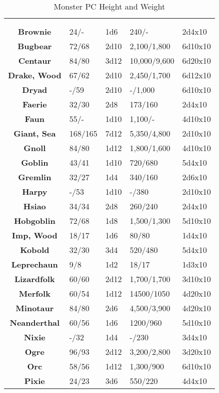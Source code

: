 \begin{multicols*}{2}
\begin {table}[H]
  \caption{Monster PC Height and Weight}\label{tab:Monster PC Height and Weight}
  \begin{tabularx}{\columnwidth}{>{\bfseries}cYYYY}
	\thead{} &  & \\
	 &  &  &  & \\
	Brownie & 24/- & 1d6 & 240/- & 2d4x10\\
	Bugbear & 72/68 & 2d10 & 2,100/1,800 & 6d10x10\\
	Centaur & 84/80 & 3d12 & 10,000/9,600 & 6d20x10\\
	Drake, Wood & 67/62 & 2d10 & 2,450/1,700 & 6d12x10\\
	Dryad & -/59 & 2d10 & -/1,000 & 6d10x10\\
	Faerie & 32/30 & 2d8 & 173/160 & 2d4x10\\
	Faun & 55/- & 1d10 & 1,100/- & 4d10x10\\
	Giant, Sea & 168/165 & 7d12 & 5,350/4,800 & 2d10x10\\
	Gnoll & 84/80 & 1d12 & 1,800/1,600 & 4d10x10\\
	Goblin & 43/41 & 1d10 & 720/680 & 5d4x10\\
	Gremlin & 32/27 & 1d4 & 340/160 & 2d6x10\\
	Harpy & -/53 & 1d10 & -/380 & 2d10x10\\
	Hsiao & 34/34 & 2d8 & 260/240 & 2d4x10\\
	Hobgoblin & 72/68 & 1d8 & 1,500/1,300 & 5d10x10\\
	Imp, Wood & 18/17 & 1d6 & 80/80 & 1d4x10\\
	Kobold & 32/30 & 3d4 & 520/480 & 5d4x10\\
	Leprechaun & 9/8 & 1d2 & 18/17 & 1d3x10\\
	Lizardfolk & 60/60 & 2d12 & 1,700/1,700 & 3d10x10\\
	Merfolk & 60/54 & 1d12 & 14500/1050 & 4d20x10\\
	Minotaur & 84/80 & 2d6 & 4,500/3,900 & 4d20x10\\
	Neanderthal & 60/56 & 1d6 & 1200/960 & 5d10x10\\
	Nixie & -/32 & 1d4 & -/230 & 3d4x10\\
	Ogre & 96/93 & 2d12 & 3,200/2,800 & 3d20x10\\
	Orc & 58/56 & 1d12 & 1,300/900 & 6d10x10\\
	Pixie & 24/23 & 3d6 & 550/220 & 4d4x10\\

\end{tabularx}
\end{table}
\end{multicols*}
